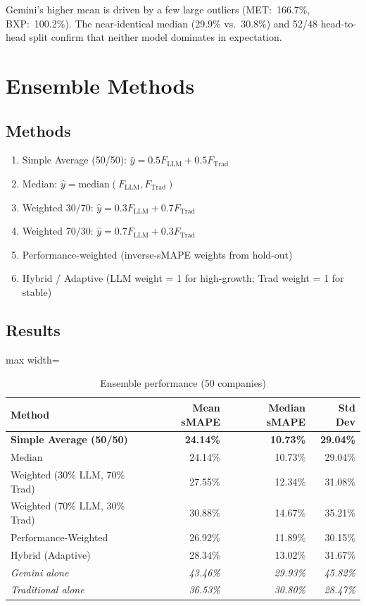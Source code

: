 \documentclass[11pt,a4paper]{article}
\begin{document}
Gemini's higher mean is driven by a few large outliers (MET:~166.7\%, BXP:~100.2\%).
The near-identical median (29.9\% vs.\ 30.8\%) and 52/48 head-to-head split confirm
that neither model dominates in expectation.

\section{Ensemble Methods}

\subsection{Methods}
\begin{enumerate}
  \item Simple Average (50/50): $\hat y=0.5F_\text{LLM}+0.5F_\text{Trad}$
  \item Median: $\hat y=\mathrm{median}(F_\text{LLM},F_\text{Trad})$
  \item Weighted 30/70: $\hat y=0.3F_\text{LLM}+0.7F_\text{Trad}$
  \item Weighted 70/30: $\hat y=0.7F_\text{LLM}+0.3F_\text{Trad}$
  \item Performance-weighted (inverse-sMAPE weights from hold-out)
  \item Hybrid / Adaptive (LLM weight = 1 for high-growth; Trad weight = 1 for stable)
\end{enumerate}

\subsection{Results}

\begin{table}[H]\centering
\caption{Ensemble performance (50 companies)}
\label{tab:ensemble}
\begin{adjustbox}{max width=\textwidth}
\begin{tabular}{lrrr}\toprule
\textbf{Method} & \textbf{Mean sMAPE} & \textbf{Median sMAPE} & \textbf{Std Dev}\\\midrule
\rowcolor{bestgreen}
\textbf{Simple Average (50/50)} & \textbf{24.14\%} & \textbf{10.73\%} & \textbf{29.04\%}\\
Median & 24.14\% & 10.73\% & 29.04\%\\
Weighted (30\% LLM, 70\% Trad) & 27.55\% & 12.34\% & 31.08\%\\
Weighted (70\% LLM, 30\% Trad) & 30.88\% & 14.67\% & 35.21\%\\
Performance-Weighted & 26.92\% & 11.89\% & 30.15\%\\
Hybrid (Adaptive) & 28.34\% & 13.02\% & 31.67\%\\\midrule
\textit{Gemini alone} & \textit{43.46\%} & \textit{29.93\%} & \textit{45.82\%}\\
\textit{Traditional alone} & \textit{36.53\%} & \textit{30.80\%} & \textit{28.47\%}\\
\bottomrule
\end{tabular}
\end{adjustbox}
\end{table}
\end{document}
